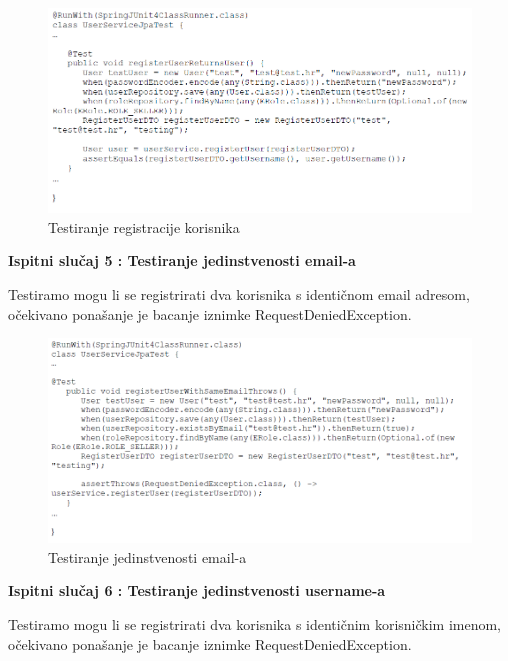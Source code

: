 		
		\begin{figure}[H]
			\includegraphics[scale=0.7]{slike/test4.PNG} %
			\centering
			\caption{Testiranje registracije korisnika}
			\label{fig:test4}
		\end{figure}
	
	\textbf{Ispitni slučaj 5 : Testiranje jedinstvenosti email-a}
	
	Testiramo mogu li se registrirati dva korisnika s identičnom email adresom, očekivano ponašanje je bacanje iznimke RequestDeniedException. 
	
	\begin{figure}[H]
		\includegraphics[scale=0.7]{slike/test5.PNG} %
		\centering
		\caption{Testiranje jedinstvenosti email-a}
		\label{fig:test5}
	\end{figure}
			
			
				\textbf{Ispitni slučaj 6 : Testiranje jedinstvenosti username-a}
			
		Testiramo mogu li se registrirati dva korisnika s identičnim korisničkim imenom, očekivano ponašanje je bacanje iznimke RequestDeniedException. 
			
